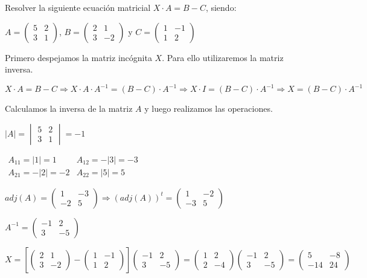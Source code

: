 \begin{ejemplo}
Resolver la siguiente ecuación matricial $X \cdot A=B-C$, siendo:

$A=\begin{pmatrix}
5 & 2 \\
3 & 1
\end{pmatrix}$, $B=\begin{pmatrix}
2 & 1 \\
3 & -2
\end{pmatrix}$ y $C=\begin{pmatrix}
1 & -1 \\
1 & 2
\end{pmatrix}$

\tcblower
Primero despejamos la matriz incógnita $X$. Para ello utilizaremos la matriz inversa.

$X \cdot A=B-C \Rightarrow  X \cdot A\cdot A^{-1}=(B-C)\cdot A^{-1} \Rightarrow X \cdot I=(B-C)\cdot A^{-1} \Rightarrow X=(B-C)\cdot A^{-1}$

Calculamos la inversa de la matriz $A$ y luego realizamos las operaciones.

$|A|=\begin{vmatrix}
5 & 2 \\
3 & 1
\end{vmatrix}= -1$

$\begin{matrix}
A_{11}=|1|= 1 & A_{12}=-|3|=-3 \\
A_{21}=-|2|= -2 & A_{22}=|5|=5 
\end{matrix} $

$adj (A)= \begin{pmatrix}
1 & -3 \\
-2 & 5
\end{pmatrix} \Rightarrow \left( adj (A) \right)^t=\begin{pmatrix}
1 & -2 \\
-3 & 5
\end{pmatrix}$

$A^{-1}=\begin{pmatrix}
-1 & 2 \\
3 & -5
\end{pmatrix}$

$X=\left[ \begin{pmatrix}
2 & 1 \\
3 & -2
\end{pmatrix} -\begin{pmatrix}
1 & -1 \\
1 & 2
\end{pmatrix} \right]\begin{pmatrix}
-1 & 2 \\
3 & -5
\end{pmatrix} = \begin{pmatrix}
1 & 2 \\
2 & -4
\end{pmatrix} \begin{pmatrix}
-1 & 2 \\
3 & -5
\end{pmatrix} = \begin{pmatrix}
5 & -8 \\
-14 & 24
\end{pmatrix} $
\end{ejemplo}

